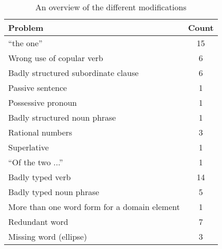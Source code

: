 \begin{table}[t]
  \centering
  \begin{tabular}{lc}
    \hline
    \textbf{Problem} & \textbf{Count} \\ 
    \hline
    ``the one'' & 15 \\
    Wrong use of copular verb & 6 \\
    Badly structured subordinate clause & 6 \\
    Passive sentence & 1 \\
    Possessive pronoun & 1 \\
    Badly structured noun phrase & 1 \\
    \hline
    Rational numbers & 3 \\
    Superlative & 1 \\
    ``Of the two ...'' & 1 \\
    \hline
    Badly typed verb & 14 \\
    Badly typed noun phrase & 5 \\
    \hline
    More than one word form for a domain element  & 1 \\
    \hline
    Redundant word & 7 \\
    Missing word (ellipse) & 3 \\
    \hline
  \end{tabular}
  \caption{An overview of the different modifications}
  \label{tbl:resultaten}
\end{table}
